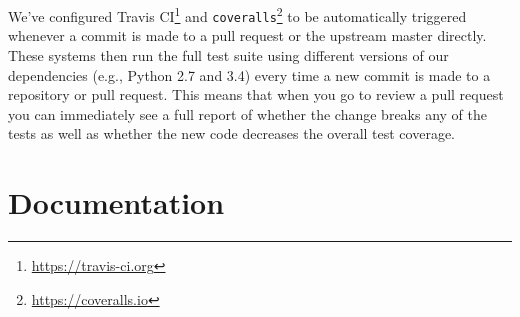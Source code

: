 


We've configured Travis CI\footnote{\url{https://travis-ci.org}} and
\texttt{coveralls}\footnote{\url{https://coveralls.io}} to be automatically
triggered whenever a commit is made to a pull request or the upstream
master directly.  These systems then run the full test suite 
using different versions of our dependencies (e.g., Python 2.7 and 3.4) %
every time a
new commit is made to a repository or pull request.
This means that when you go to review a pull request you can immediately see
a full report of whether the change breaks any of the tests as well as whether
the new code decreases the overall test coverage.

%
%
%
%
%
%

\section{\label{sec:doc}Documentation}

